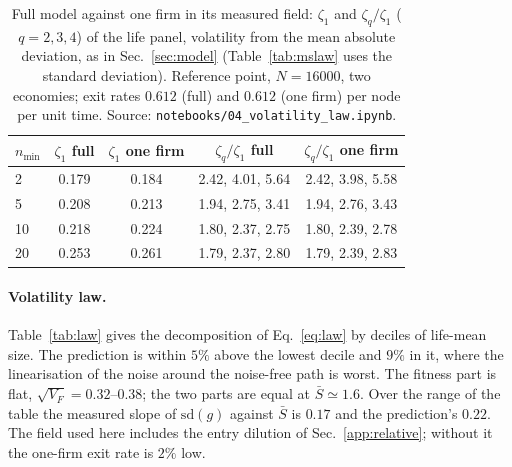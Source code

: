 \documentclass[pre,twocolumn,superscriptaddress,nofootinbib]{revtex4-2}
\newcommand{\Sb}{\bar S}
\begin{document}
\begin{table}[t]
\caption{Full model against one firm in its measured field: $\zeta_1$ and $\zeta_q/\zeta_1$ ($q=2,3,4$) of the
life panel, volatility from the mean absolute deviation, as in Sec.~\ref{sec:model} (Table~\ref{tab:mslaw} uses the
standard deviation).  Reference point, $N=16000$, two economies; exit rates $0.612$ (full) and
$0.612$ (one firm) per node per unit time.  Source: \texttt{notebooks/04\_volatility\_law.ipynb}.}
\label{tab:reduction}
\begin{ruledtabular}
\begin{tabular}{lcccc}
$n_{\min}$ & $\zeta_1$ full & $\zeta_1$ one firm & $\zeta_q/\zeta_1$ full & $\zeta_q/\zeta_1$ one firm\\
\hline
2  & 0.179 & 0.184 & 2.42, 4.01, 5.64 & 2.42, 3.98, 5.58\\
5  & 0.208 & 0.213 & 1.94, 2.75, 3.41 & 1.94, 2.76, 3.43\\
10 & 0.218 & 0.224 & 1.80, 2.37, 2.75 & 1.80, 2.39, 2.78\\
20 & 0.253 & 0.261 & 1.79, 2.37, 2.80 & 1.79, 2.39, 2.83\\
\end{tabular}
\end{ruledtabular}
\end{table}

\paragraph{Volatility law.}  Table~\ref{tab:law} gives the decomposition of Eq.~\eqref{eq:law} by
deciles of life-mean size.  The prediction is within $5\%$ above the lowest decile and $9\%$ in it,
where the linearisation of the noise around the noise-free path is worst.  The fitness part is flat,
$\sqrt{V_F}=0.32$--$0.38$; the two parts are equal at $\Sb\simeq1.6$.  Over the range of the table the
measured slope of $\mathrm{sd}(g)$ against $\Sb$ is $0.17$ and the prediction's $0.22$.  The field used here
includes the entry dilution of Sec.~\ref{app:relative}; without it the one-firm exit rate is $2\%$ low.
\end{document}
